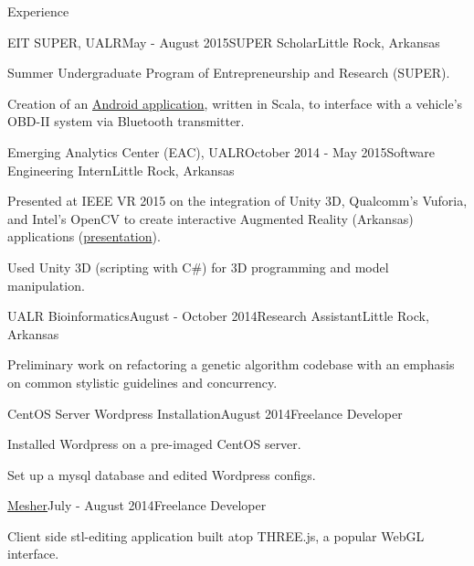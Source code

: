 \documentclass{resume} %
\begin{document}
\begin{rSection}{Experience}
\begin{rSubsection}{EIT SUPER, UALR}{May - August 2015}{SUPER Scholar}{Little Rock, Arkansas}

	\item Summer Undergraduate Program of Entrepreneurship and Research (SUPER).
	\item Creation of an \href{http://github.com/cptaffe/flamethrower}{Android application}, written in Scala, to interface with a vehicle's OBD-II system via Bluetooth transmitter.
\end{rSubsection}

\begin{rSubsection}{Emerging Analytics Center (EAC), UALR}{October 2014 - May 2015}{Software Engineering Intern}{Little Rock, Arkansas}
	\item Presented at IEEE VR 2015 on the integration of Unity 3D, Qualcomm's Vuforia, and Intel's OpenCV to create interactive Augmented Reality (Arkansas) applications (\href{http://byteflame.org/ieee_vr/}{presentation}{}).
	\item Used Unity 3D (scripting with C\#) for 3D programming and model manipulation.
\end{rSubsection}

\begin{rSubsection}{UALR Bioinformatics}{August - October 2014}{Research Assistant}{Little Rock, Arkansas}

	\item Preliminary work on refactoring a genetic algorithm codebase with an emphasis on common stylistic guidelines and concurrency.
\end{rSubsection}

\begin{rSubsection}{CentOS Server Wordpress Installation}{August 2014}{Freelance Developer}{}

	\item Installed Wordpress on a pre-imaged CentOS server.
	\item Set up a mysql database and edited Wordpress configs.
\end{rSubsection}

\begin{rSubsection}{\href{http://github.com/cptaffe/Mesher}{Mesher}}{July - August 2014}{Freelance Developer}{}

	\item Client side stl-editing application built atop THREE.js, a popular WebGL interface.
\end{rSubsection}


\end{rSection}
\end{document}
